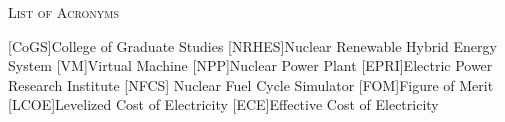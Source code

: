 \documentclass[12pt]{UIdahoMastersThesis}
\begin{document}
\tableofcontents
\newpage








\begin{center}
	{\LARGE\textsc{List of Acronyms}}
\end{center}

\begin{acronym}[NRHES]  %
    [CoGS]{College of Graduate Studies}
    [NRHES]{Nuclear Renewable Hybrid Energy System}
    [VM]{Virtual Machine}  %
    [NPP]{Nuclear Power Plant}
    [EPRI]{Electric Power Research Institute}
    [NFCS] {Nuclear Fuel Cycle Simulator}
    [FOM]{Figure of Merit}
    [LCOE]{Levelized Cost of Electricity}
    [ECE]{Effective Cost of Electricity}
\end{acronym}



\mainmatter  %
\setcounter{secnumdepth}{3}  %
\end{document}
